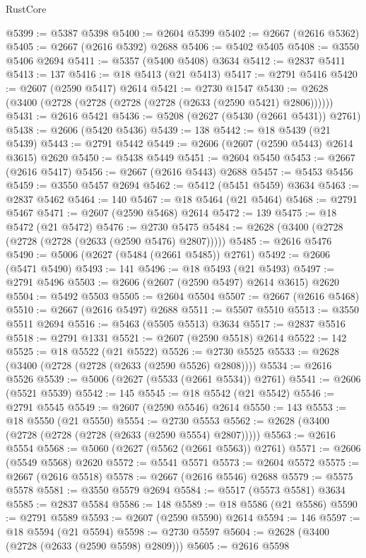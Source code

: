 \begin{lexlean}{RustCore}
\begin{coremodule}
@5399 := @5387 @5398
@5400 := @2604 @5399
@5402 := @2667 (@2616 @5362)
@5405 := @2667 (@2616 @5392) @2688
@5406 := @5402 @5405
@5408 := @3550 @5406 @2694
@5411 := @5357 (@5400 @5408) @3634
@5412 := @2837 @5411
@5413 := 137
@5416 := @18 @5413 (@21 @5413)
@5417 := @2791 @5416
@5420 := @2607 (@2590 @5417) @2614
@5421 := @2730 @1547
@5430 := @2628 (@3400 (@2728 (@2728 (@2728 (@2728 (@2633 (@2590 @5421) @2806))))))
@5431 := @2616 @5421
@5436 := @5208 (@2627 (@5430 (@2661 @5431)) @2761)
@5438 := @2606 (@5420 @5436)
@5439 := 138
@5442 := @18 @5439 (@21 @5439)
@5443 := @2791 @5442
@5449 := @2606 (@2607 (@2590 @5443) @2614 @3615) @2620
@5450 := @5438 @5449
@5451 := @2604 @5450
@5453 := @2667 (@2616 @5417)
@5456 := @2667 (@2616 @5443) @2688
@5457 := @5453 @5456
@5459 := @3550 @5457 @2694
@5462 := @5412 (@5451 @5459) @3634
@5463 := @2837 @5462
@5464 := 140
@5467 := @18 @5464 (@21 @5464)
@5468 := @2791 @5467
@5471 := @2607 (@2590 @5468) @2614
@5472 := 139
@5475 := @18 @5472 (@21 @5472)
@5476 := @2730 @5475
@5484 := @2628 (@3400 (@2728 (@2728 (@2728 (@2633 (@2590 @5476) @2807)))))
@5485 := @2616 @5476
@5490 := @5006 (@2627 (@5484 (@2661 @5485)) @2761)
@5492 := @2606 (@5471 @5490)
@5493 := 141
@5496 := @18 @5493 (@21 @5493)
@5497 := @2791 @5496
@5503 := @2606 (@2607 (@2590 @5497) @2614 @3615) @2620
@5504 := @5492 @5503
@5505 := @2604 @5504
@5507 := @2667 (@2616 @5468)
@5510 := @2667 (@2616 @5497) @2688
@5511 := @5507 @5510
@5513 := @3550 @5511 @2694
@5516 := @5463 (@5505 @5513) @3634
@5517 := @2837 @5516
@5518 := @2791 @1331
@5521 := @2607 (@2590 @5518) @2614
@5522 := 142
@5525 := @18 @5522 (@21 @5522)
@5526 := @2730 @5525
@5533 := @2628 (@3400 (@2728 (@2728 (@2633 (@2590 @5526) @2808))))
@5534 := @2616 @5526
@5539 := @5006 (@2627 (@5533 (@2661 @5534)) @2761)
@5541 := @2606 (@5521 @5539)
@5542 := 145
@5545 := @18 @5542 (@21 @5542)
@5546 := @2791 @5545
@5549 := @2607 (@2590 @5546) @2614
@5550 := 143
@5553 := @18 @5550 (@21 @5550)
@5554 := @2730 @5553
@5562 := @2628 (@3400 (@2728 (@2728 (@2728 (@2633 (@2590 @5554) @2807)))))
@5563 := @2616 @5554
@5568 := @5060 (@2627 (@5562 (@2661 @5563)) @2761)
@5571 := @2606 (@5549 @5568) @2620
@5572 := @5541 @5571
@5573 := @2604 @5572
@5575 := @2667 (@2616 @5518)
@5578 := @2667 (@2616 @5546) @2688
@5579 := @5575 @5578
@5581 := @3550 @5579 @2694
@5584 := @5517 (@5573 @5581) @3634
@5585 := @2837 @5584
@5586 := 148
@5589 := @18 @5586 (@21 @5586)
@5590 := @2791 @5589
@5593 := @2607 (@2590 @5590) @2614
@5594 := 146
@5597 := @18 @5594 (@21 @5594)
@5598 := @2730 @5597
@5604 := @2628 (@3400 (@2728 (@2633 (@2590 @5598) @2809)))
@5605 := @2616 @5598

\end{coremodule}
\end{lexlean}
